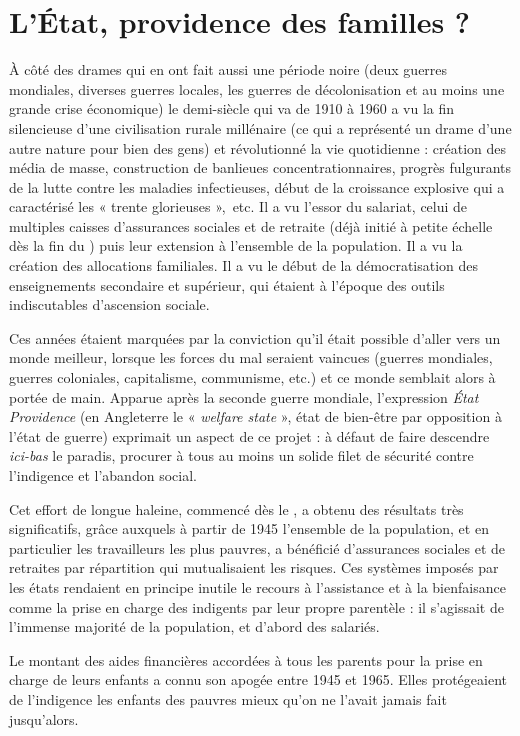 
\chapter{L'État, providence des familles ?}


 À côté des drames qui en ont fait aussi une période noire (deux guerres mondiales, diverses guerres locales, les guerres de décolonisation et au moins une grande crise économique) le demi-siècle qui va de 1910 à 1960 a vu la fin silencieuse d'une civilisation rurale millénaire (ce qui a représenté un drame d'une autre nature pour bien des gens) et révolutionné la vie quotidienne : création des média de masse, construction de banlieues concentrationnaires, progrès fulgurants de la lutte contre les maladies infectieuses, début de la croissance explosive qui a caractérisé les « trente glorieuses »,~etc. Il a vu l'essor du salariat, celui de multiples caisses d'assurances sociales et de retraite (déjà initié à petite échelle dès la fin du ) puis leur extension à l'ensemble de la population. Il a vu la création des allocations familiales. Il a vu le début de la démocratisation des enseignements secondaire et supérieur, qui étaient à l'époque des outils indiscutables d'ascension sociale. 

 Ces années étaient marquées par la conviction qu'il était possible d'aller vers un monde meilleur, lorsque les forces du mal seraient vaincues (guerres mondiales, guerres coloniales, capitalisme, communisme, etc.) et ce monde semblait alors à portée de main. Apparue après la seconde guerre mondiale, l'expression \emph{État Providence} (en Angleterre le « \emph{welfare state} », état de bien-être par opposition à l'état de guerre) exprimait un aspect de ce projet : à défaut de faire descendre {\emph{ici-bas}} le paradis, procurer à tous au moins un solide filet de sécurité contre l'indigence et l'abandon social. 

 Cet effort de longue haleine, commencé dès le , a obtenu des résultats très significatifs, grâce auxquels à partir de 1945 l'ensemble de la population, et en particulier les travailleurs les plus pauvres, a bénéficié d'assurances sociales et de retraites par répartition qui mutualisaient les risques. Ces systèmes imposés par les états rendaient en principe inutile le recours à l'assistance et à la bienfaisance comme la prise en charge des indigents par leur propre parentèle : il s'agissait de l'immense majorité de la population, et d'abord des salariés. 

 Le montant des aides financières accordées à tous les parents pour la prise en charge de leurs enfants a connu son apogée entre 1945 et 1965. Elles protégeaient de l'indigence les enfants des pauvres mieux qu'on ne l'avait jamais fait jusqu'alors. 

